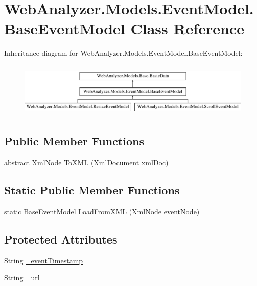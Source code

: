 \hypertarget{class_web_analyzer_1_1_models_1_1_event_model_1_1_base_event_model}{}\section{Web\+Analyzer.\+Models.\+Event\+Model.\+Base\+Event\+Model Class Reference}
\label{class_web_analyzer_1_1_models_1_1_event_model_1_1_base_event_model}
Inheritance diagram for Web\+Analyzer.\+Models.\+Event\+Model.\+Base\+Event\+Model\+:\begin{figure}[H]
\begin{center}
\leavevmode
\includegraphics[height=2.625000cm]{class_web_analyzer_1_1_models_1_1_event_model_1_1_base_event_model}
\end{center}
\end{figure}
\subsection*{Public Member Functions}
\begin{DoxyCompactItemize}
\item 
abstract Xml\+Node \hyperlink{class_web_analyzer_1_1_models_1_1_event_model_1_1_base_event_model_a8e39cb407315d0f6eca3fb8e854e8dba}{To\+X\+M\+L} (Xml\+Document xml\+Doc)
\end{DoxyCompactItemize}
\subsection*{Static Public Member Functions}
\begin{DoxyCompactItemize}
\item 
static \hyperlink{class_web_analyzer_1_1_models_1_1_event_model_1_1_base_event_model}{Base\+Event\+Model} \hyperlink{class_web_analyzer_1_1_models_1_1_event_model_1_1_base_event_model_a04c1e146840d80a80575bd4644dad0c8}{Load\+From\+X\+M\+L} (Xml\+Node event\+Node)
\end{DoxyCompactItemize}
\subsection*{Protected Attributes}
\begin{DoxyCompactItemize}
\item 
String \hyperlink{class_web_analyzer_1_1_models_1_1_event_model_1_1_base_event_model_ab4e25a53d20e317344a9df113ec2aab7}{\+\_\+event\+Timestamp}
\item 
String \hyperlink{class_web_analyzer_1_1_models_1_1_event_model_1_1_base_event_model_a8cfc8644deaf4edfec7fcd7f08dfa20c}{\+\_\+url}
\end{DoxyCompactItemize}
